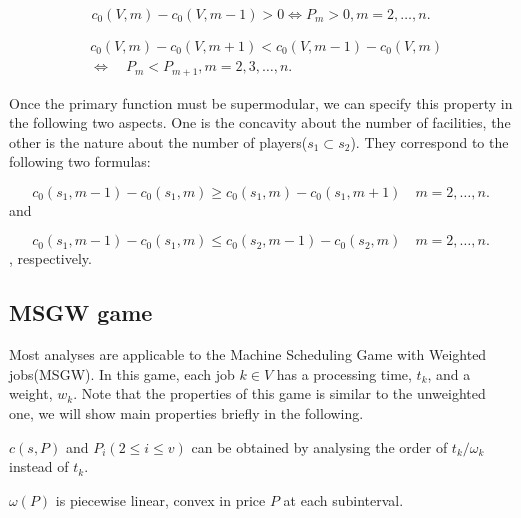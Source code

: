 \begin{lem}\label{lem2}
\[c_0(V,m)- c_0(V,m-1) > 0 \Leftrightarrow P_m > 0, m=2,\ldots,n.\]
\end{lem}

\begin{lem}\label{lem3}
\[
\begin{aligned}
&c_0 (V,m) - c_0 (V,m+1) < c_0 (V,m-1) - c_0 (V,m) \\
&\Leftrightarrow \quad P_m < P_{m+1} , m=2,3,\ldots,n.
\end{aligned}
\]
\end{lem}

Once the primary function must be supermodular, we can specify this property in the following two aspects.
One is the concavity about the number of facilities,
the other is the nature about the number of players($s_1 \subset s_2$).
They correspond to the following two formulas:

\begin{equation}\label{concavity_f}
c_0(s_1,m-1)-c_0(s_1,m) \geq
  c_0(s_1,m)-c_0(s_1,m+1) \quad m=2,\ldots,n.
\end{equation}
and

\begin{equation}\label{property_p}
	c_0(s_1,m-1)-c_0(s_1,m) \leq
	  c_0(s_2,m-1)-c_0(s_2,m) \quad m=2,\ldots,n.
\end{equation}
, respectively.

\subsection*{MSGW game}
Most analyses are applicable to the Machine Scheduling Game with Weighted jobs(MSGW).
In this game, each job $k \in V$ has a processing time, $t_k$, and a weight, $w_k$.
Note that the properties of this game is similar to the unweighted one, we will show main properties briefly in the following.

\begin{corollary} \label{cor-1}
$c(s,P)$ and $P_i(2 \leq i \leq v)$ can be obtained by analysing the order of $t_k/\omega_k$ instead of $t_k$.

\end{corollary}

\begin{corollary} \label{cor-2}
  $\omega(P)$ is piecewise linear, convex in price $P$ at each subinterval.
\end{corollary}

